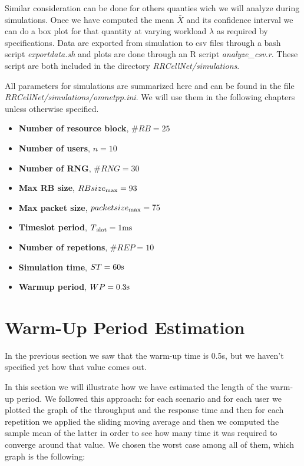 Similar consideration can be done for others quanties wich we will analyze during simulations. Once we have computed the mean \(\bar{X}\) and its confidence interval we can do a box plot for that quantity at varying workload \(\lambda\) as required by specifications. Data are exported from simulation to csv files through a bash script \textit{exportdata.sh} and plots are done through an R script \textit{analyze\_csv.r}. These script are both included in the directory \textit{RRCellNet/simulations}.

All parameters for simulations are summarized here and can be found in the file \textit{RRCellNet/simulations/omnetpp.ini}. We will use them in the following chapters unless otherwise specified.
\begin{itemize}
\item \textbf{Number of resource block}, \(\#RB = 25\)
\item \textbf{Number of users}, \(n = 10\)
\item \textbf{Number of RNG}, \(\#RNG = 30\)
\item \textbf{Max RB size}, \(RBsize\textsubscript{max} = 93\)
\item \textbf{Max packet size}, \(packetsize\textsubscript{max} = 75\)
\item \textbf{Timeslot period}, \(T\textsubscript{slot} = 1\textnormal{ms}\)
\item \textbf{Number of repetions}, \(\#REP = 10\)
\item \textbf{Simulation time}, \(ST = 60 \textnormal{s}\)
\item \textbf{Warmup period}, \(WP = 0.3 \textnormal{s}\)
\end{itemize}

\section{Warm-Up Period Estimation}
In the previous section we saw that the warm-up time is 0.5s, but we haven't specified yet how that value comes out.

In this section we will illustrate how we have estimated the length of the warm-up period. We followed this approach: for each scenario and for each user we plotted the graph of the throughput and the response time and then for each repetition we applied the sliding moving average and then we computed the sample mean of the latter in order to see how many time it was required to converge around that value.
We chosen the worst case among all of them, which graph is the following:

